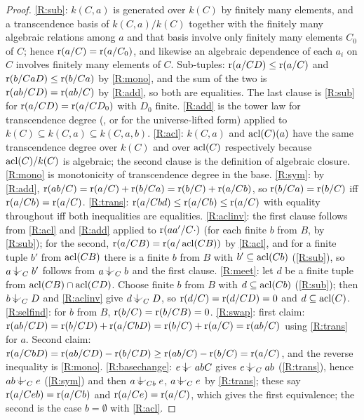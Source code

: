 \begin{proof}
\ref{R:sub}: $k(C,a)$ is generated over $k(C)$ by finitely many elements, and a
transcendence basis of $k(C,a)/k(C)$ together with the finitely many algebraic
relations among $a$ and that basis involve only finitely many elements $C_0$ of $C$;
hence $\operatorname{r}(a/C)=\operatorname{r}(a/C_0)$, and likewise an algebraic dependence of each $a_i$ on $C$
involves finitely many elements of $C$.  Sub-tuples: $\operatorname{r}(a/CD)\le\operatorname{r}(a/C)$ and
$\operatorname{r}(b/CaD)\le\operatorname{r}(b/Ca)$ by \ref{R:mono}, and the sum of the two is
$\operatorname{r}(ab/CD)=\operatorname{r}(ab/C)$ by \ref{R:add}, so both are equalities.  The last clause is
\ref{R:sub} for $\operatorname{r}(a/CD)=\operatorname{r}(a/CD_0)$ with $D_0$ finite.
\ref{R:add} is the tower law for transcendence degree
(, or  for the universe-lifted form)
applied to $k(C)\subseteq k(C,a)\subseteq k(C,a,b)$.
\ref{R:acl}: $k(C,a)$ and $\operatorname{acl}(C)(a)$ have the same transcendence degree over $k(C)$
and over $\operatorname{acl}(C)$ respectively because $\operatorname{acl}(C)/k(C)$ is algebraic; the second clause
is the definition of algebraic closure.  \ref{R:mono} is monotonicity of transcendence
degree in the base.  \ref{R:sym}: by \ref{R:add}, $\operatorname{r}(ab/C)=\operatorname{r}(a/C)+\operatorname{r}(b/Ca)
=\operatorname{r}(b/C)+\operatorname{r}(a/Cb)$, so $\operatorname{r}(b/Ca)=\operatorname{r}(b/C)$ iff $\operatorname{r}(a/Cb)=\operatorname{r}(a/C)$.
\ref{R:trans}: $\operatorname{r}(a/Cbd)\le\operatorname{r}(a/Cb)\le\operatorname{r}(a/C)$ with equality throughout iff
both inequalities are equalities.  \ref{R:aclinv}: the first clause follows from \ref{R:acl} and \ref{R:add}
applied to $\operatorname{r}(aa'/C\cdot)$ (for each finite $b$ from $B$, by \ref{R:sub}); for the
second, $\operatorname{r}(a/CB)=\operatorname{r}(a/\operatorname{acl}(CB))$ by \ref{R:acl}, and for a finite tuple $b'$ from
$\operatorname{acl}(CB)$ there is a finite $b$ from $B$ with $b'\subseteq\operatorname{acl}(Cb)$ (\ref{R:sub}), so
$a\ind{C}b'$ follows from $a\ind{C}b$ and the first clause.  \ref{R:meet}: let $d$ be
a finite tuple from $\operatorname{acl}(CB)\cap\operatorname{acl}(CD)$.  Choose finite $b$ from $B$ with
$d\subseteq\operatorname{acl}(Cb)$ (\ref{R:sub}); then $b\ind{C}D$ and \ref{R:aclinv} give $d\ind{C}D$,
so $\operatorname{r}(d/C)=\operatorname{r}(d/CD)=0$ and $d\subseteq\operatorname{acl}(C)$.  \ref{R:selfind}: for $b$ from $B$,
$\operatorname{r}(b/C)=\operatorname{r}(b/CB)=0$.
\ref{R:swap}: first claim: $\operatorname{r}(ab/CD)=\operatorname{r}(b/CD)+\operatorname{r}(a/CbD)=\operatorname{r}(b/C)+\operatorname{r}(a/C)=
\operatorname{r}(ab/C)$ using \ref{R:trans} for $a$.  Second claim: $\operatorname{r}(a/CbD)=\operatorname{r}(ab/CD)-\operatorname{r}(b/CD)
\ge\operatorname{r}(ab/C)-\operatorname{r}(b/C)=\operatorname{r}(a/C)$, and the reverse inequality is \ref{R:mono}.
\ref{R:basechange}: $e\ind{}abC$ gives $e\ind{C}ab$ (\ref{R:trans}), hence $ab\ind{C}e$
(\ref{R:sym}) and then $a\ind{Cb}e$, $a\ind{C}e$ by \ref{R:trans}; these say
$\operatorname{r}(a/Ceb)=\operatorname{r}(a/Cb)$ and $\operatorname{r}(a/Ce)=\operatorname{r}(a/C)$, which gives the first
equivalence; the second is the case $b=\emptyset$ with \ref{R:acl}.
\end{proof}

